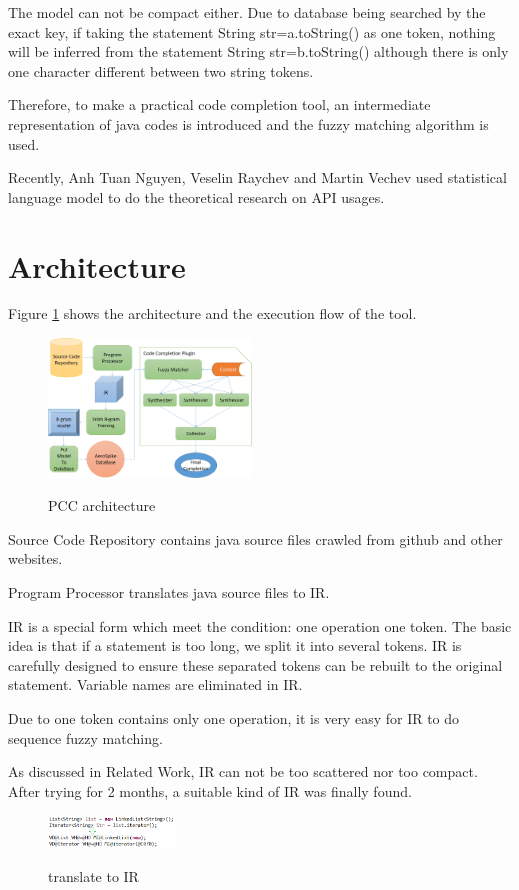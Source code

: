 \documentclass{sig-alternate-05-2015}
\begin{document}
The model can not be compact either. Due to database being searched by the exact key, if taking the statement String str=a.toString() as one token, nothing will be inferred from the statement String str=b.toString() although there is only one character different between two string tokens.

Therefore, to make a practical code completion tool, an intermediate representation of java codes is introduced and the fuzzy matching algorithm is used.

Recently, Anh Tuan Nguyen\cite{DBLP:conf/icse/NguyenN15}, Veselin Raychev and Martin Vechev\cite{DBLP:conf/pldi/RaychevVY14} used statistical language model to do the theoretical research on API usages.

\section{Architecture}

Figure \ref{architecture} shows the architecture and the execution flow of the tool.
\\\begin{figure}[htbp]
  \centering
  \includegraphics[width=0.48\textwidth]{pics/architecture.png}\\
  \caption{PCC architecture}\label{architecture}
\end{figure}

Source Code Repository contains java source files crawled from github and other websites.

Program Processor translates java source files to IR.

IR is a special form which meet the condition: one operation one token. The basic idea is that if a statement is too long, we split it into several tokens. IR is carefully designed to ensure these separated tokens can be rebuilt to the original statement. Variable names are eliminated in IR.

Due to one token contains only one operation, it is very easy for IR to do sequence fuzzy matching.

As discussed in Related Work, IR can not be too scattered nor too compact. After trying for 2 months, a suitable kind of IR was finally found.
\\\begin{figure}[htbp]
  \centering
  \includegraphics[width=0.3\textwidth]{pics/toIR1.png}\\
  \vspace{-0.1cm}
  \caption{translate to IR}\label{toIR1}
\end{figure}
\end{document}
